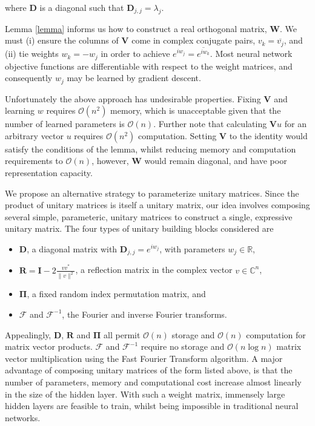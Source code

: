\documentclass{article} %
\newcommand{\matr}[1]{\mathbf{#1}}
\newcommand\RR{\mathbb{R}}
\begin{document}
where $\matr{D}$ is a diagonal such that $\matr{D}_{j,j} = \lambda_j$. 

Lemma \ref{lemma} informs us how to construct a real orthogonal matrix, $\matr{W}$.
We must (i) ensure the columns of $\matr{V}$ come in complex conjugate pairs, $v_k = \overline{v_j}$, and
(ii) tie weights $w_k=-w_j$ in order to achieve $e^{i w_j} = \overline{e^{i w_k}}$. 
Most neural network objective functions are differentiable with respect to the weight matrices,
and consequently $w_j$ may be learned by gradient descent. 

Unfortunately the above approach has undesirable properties. 
Fixing $\matr{V}$ and learning $w$ requires $\mathcal{O}\left(n^2\right)$ memory, 
which is unacceptable given that the number of learned parameters is $\mathcal{O}(n)$. 
Further note that calculating $\matr{V} u$ for an arbitrary vector $u$ 
requires $\mathcal{O}(n^2)$ computation. 
Setting $\matr{V}$ to the identity would satisfy the conditions of the lemma, whilst reducing  
memory and computation requirements to $\mathcal{O}(n)$, however, $\matr{W}$ would remain diagonal, 
and have poor representation capacity.

We propose an alternative strategy to parameterize unitary matrices. 
Since the product of unitary matrices is itself a unitary matrix, our idea involves
composing several simple, parameteric, unitary matrices to construct a single, expressive unitary matrix.
The four types of unitary building blocks considered are 

\begin{itemize}
  \item $\matr{D}$, a diagonal matrix with $\matr{D}_{j,j} = e^{i w_j}$, with parameters $w_j \in \RR$,
  \item $\matr{R} = \matr{I} - 2 \frac{v v^*}{\|v\|^2}$, a reflection matrix in the complex vector 
  $v \in \mathbb{C}^n$, 
  \item $\matr{\Pi}$, a fixed random index permutation matrix, and
  \item $\mathcal{F}$ and $\mathcal{F}^{-1}$, the Fourier and inverse Fourier transforms.
\end{itemize}

Appealingly, $\matr{D}$, $\matr{R}$ and $\matr{\Pi}$ all permit $\mathcal{O}(n)$ storage and 
$\mathcal{O}(n)$ computation for matrix vector products. $\mathcal{F}$ and $\mathcal{F}^{-1}$
require no storage and $\mathcal{O}(n \log n)$ matrix vector multiplication using the Fast Fourier
Transform algorithm. A major advantage of composing unitary matrices of the form listed above, is 
that the number of parameters, memory and computational cost increase almost linearly in the size
of the hidden layer. With such a weight matrix, immensely large hidden layers are feasible to train, 
whilst being impossible in traditional neural networks. 
 
\end{document}
